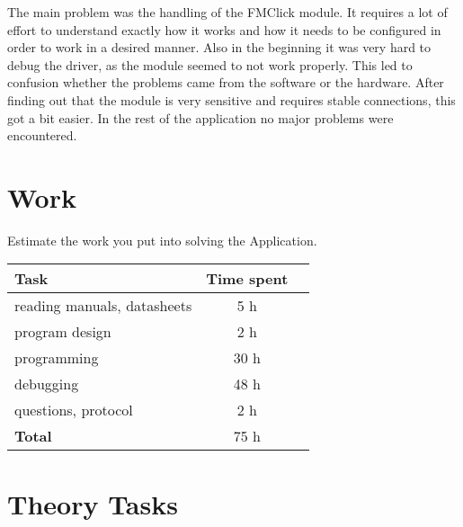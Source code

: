 \documentclass[12pt,a4paper,titlepage,oneside]{article}
\begin{document}
The main problem was the handling of the FMClick module. It 
requires a lot of effort to understand exactly how it works and how it needs
to be configured in order to work in a desired manner. Also in the beginning
it was very hard to debug the driver, as the module seemed to not work properly.
This led to confusion whether the problems came from the software or the hardware.
After finding out that the module is very sensitive and requires stable connections,
this got a bit easier. In the rest of the application no major problems were
encountered.

\section{Work}

Estimate the work you put into solving the Application.

\begin{tabular}{|l|c|c|}\hline
	Task & Time spent \\ \hline

	reading manuals, datasheets &  5 h\\
	program design              &  2 h\\
	programming                 & 30 h\\
	debugging                   & 48 h\\
	questions, protocol         &  2 h\\ \hline

	\textbf{Total}              & 75 h\\ \hline
\end{tabular}

\section{Theory Tasks}







\newpage
\end{document}
